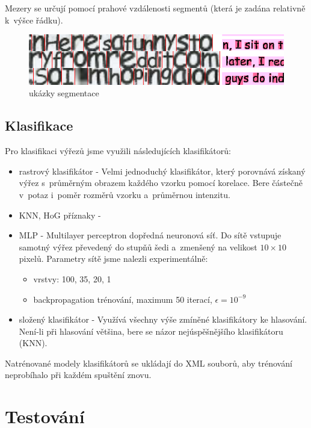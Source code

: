 \documentclass[12pt]{article}
\begin{document}
Mezery se určují pomocí prahové vzdálenosti segmentů (která je zadána relativně k~výšce řádku).

\begin{figure}[htb]
  \centering
  \includegraphics[width=13.5cm,keepaspectratio]{cutouts.png}
  \caption{ukázky segmentace}
\end{figure}

\subsection{Klasifikace}

Pro klasifikaci výřezů jsme využili následujících klasifikátorů:

\begin{itemize}
  \item rastrový klasifikátor \cite{ocr} - Velmi jednoduchý klasifikátor, který porovnává získaný výřez s~průměrným obrazem každého vzorku pomocí korelace. Bere částečně v~potaz i~poměr rozměrů vzorku a~průměrnou intenzitu.
  \item KNN, HoG příznaky - 
  \item MLP - Multilayer perceptron dopředná neuronová síť. Do sítě vstupuje samotný výřez převedený do stupňů šedi a~zmenšený na velikost $10 \times 10$ pixelů. Parametry sítě jsme nalezli experimentálně: 
    \begin{itemize}
      \item vrstvy: 100, 35, 20, 1
      \item backpropagation trénování, maximum 50 iterací, $\epsilon = 10^{-9}$
    \end{itemize}
  \item složený klasifikátor - Využívá všechny výše zmíněné klasifikátory ke hlasování. Není-li při hlasování většina, bere se názor nejúspěšnějšího klasifikátoru (KNN).
\end{itemize}

Natrénované modely klasifikátorů se ukládají do XML souborů, aby trénování neprobíhalo při každém spuštění znovu.

\section{Testování}
\end{document}
